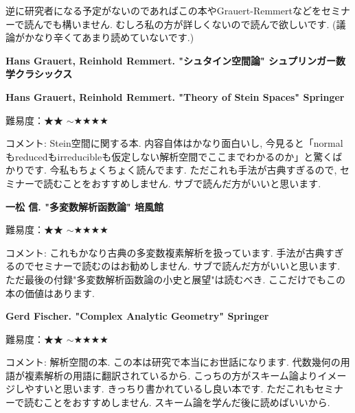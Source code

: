 逆に研究者になる予定がないのであればこの本やGrauert-Remmertなどをセミナーで読んでも構いません. むしろ私の方が詳しくないので読んで欲しいです. (議論がかなり辛くてあまり読めていないです.) 
 \vspace{8pt}

\textbf{Hans Grauert, Reinhold Remmert. "シュタイン空間論" シュプリンガー数学クラシックス}  　\vspace{-6pt} 

\textbf{Hans Grauert, Reinhold Remmert. "Theory of Stein Spaces" Springer }  　\vspace{-6pt} 

難易度：★★ $\sim$★★★★ 　\vspace{-6pt} 

コメント: Stein空間に関する本. 内容自体はかなり面白いし, 今見ると「normalもreducedもirreducibleも仮定しない解析空間でここまでわかるのか」と驚くばかりです. 今私もちょくちょく読んでます. 
ただこれも手法が古典すぎるので, セミナーで読むことをおすすめしません. サブで読んだ方がいいと思います.
\vspace{8pt}

\textbf{一松 信. "多変数解析函数論" 培風館}  　\vspace{-6pt} 

難易度：★★ $\sim$★★★★ 　\vspace{-6pt} 

コメント: これもかなり古典の多変数複素解析を扱っています. 手法が古典すぎるのでセミナーで読むのはお勧めしません. サブで読んだ方がいいと思います.
ただ最後の付録"多変数解析函数論の小史と展望"は読むべき. ここだけでもこの本の価値はあります. 
\vspace{8pt}


\textbf{Gerd Fischer. "Complex Analytic Geometry" Springer}  　\vspace{-6pt} 

難易度：★★ $\sim$★★★★ 　\vspace{-6pt} 

コメント: 解析空間の本. この本は研究で本当にお世話になります. 代数幾何の用語が複素解析の用語に翻訳されているから. こっちの方がスキーム論よりイメージしやすいと思います. きっちり書かれているし良い本です. 
ただこれもセミナーで読むことをおすすめしません. スキーム論を学んだ後に読めばいいから. 
 
